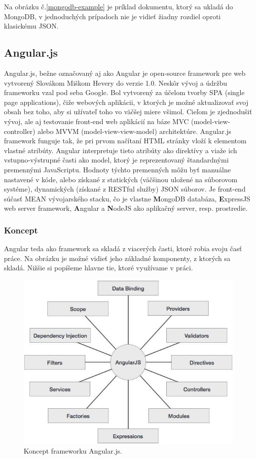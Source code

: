 Na obrázku č.\ref{mongodb-example} je príklad dokumentu, ktorý sa ukladá do MongoDB, v jednoduchých prípadoch nie je vidieť žiadny rozdiel oproti klasickému JSON.

\subsection{Angular.js}
Angular.js, bežne označovaný aj ako Angular je open-source framework pre web vytvorený Slovákom Miškom Hevery do verzie 1.0. Neskôr vývoj a údržbu frameworku vzal pod seba Google. Bol vytvorený za účelom tvorby SPA (single page applications), čiže webových aplikácii, v ktorých je možné aktualizovať svoj obsah bez toho, aby si užívateľ toho vo väčšej miere všimol. Cieľom je zjednodušiť vývoj, ale aj testovanie front-end web aplikácií na báze MVC (model-view-controller) alebo MVVM (model-view-view-model) architektúre.
Angular.js framework funguje tak, že pri prvom načítaní HTML stránky vloží k elementom vlastné atribúty. Angular interpretuje tieto atribúty ako direktívy a viaže ich vstupno-výstrupné časti ako model, ktorý je reprezentovaný štandardnými premennými JavaScriptu. Hodnoty týchto premenných môžu byť manuálne nastavené v kóde, alebo získané z statických (väčšinou uložené na súborovom systéme), dynamických (získané z RESTful služby) JSON súborov.
Je front-end súčasť MEAN vývojarského stacku, čo je vlastne \textbf{M}ongoDB databáza, \textbf{E}xpressJS web server framework, \textbf{A}ngular  a \textbf{N}odeJS ako aplikačný server, resp. prostredie.\cite{angular-wiki}\cite{angular-docs}

\subsubsection{Koncept}
Angular teda ako framework sa skladá z viacerých časti, ktoré robia svoju časť práce. Na obrázku je možné vidieť jeho základné komponenty, z ktorých sa skladá. Nižšie si popíšeme hlavne tie, ktoré využívame v práci.\cite{angular-concept}

\begin{figure}[H]
  \centering
  \includegraphics[scale=0.5]{img/angular/angularjs_concepts.jpg}
  \caption{Koncept frameworku Angular.js.}
  \label{img-angular-concept}
\end{figure}

